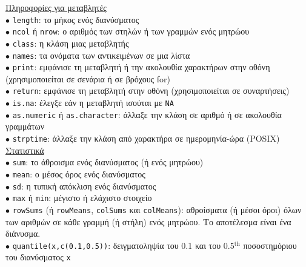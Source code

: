\documentclass[a4paper,10pt,twocolumn]{article}
\begin{document}
\noindent \underline{Πληροφορίες για μεταβλητές}\\
$\bullet$ \texttt{length}: το μήκος ενός διανύσματος\\
$\bullet$ \texttt{ncol} ή \texttt{nrow}: ο αριθμός των στηλών ή των γραμμών ενός μητρώου\\
$\bullet$ \texttt{class}: η κλάση μιας μεταβλητής \\
$\bullet$ \texttt{names}: τα ονόματα των αντικειμένων σε μια λίστα \\
$\bullet$ \texttt{print}: εμφάνισε τη μεταβλητή ή την ακολουθία χαρακτήρων στην οθόνη (χρησιμοποιείται σε
σενάρια ή σε βρόχους for) \\
$\bullet$ \texttt{return}: εμφάνισε τη μεταβλητή στην οθόνη (χρησιμοποιείται σε συναρτήσεις) \\
$\bullet$ \texttt{is.na}: έλεγξε εάν η μεταβλητή ισούται με \texttt{NA}\\
$\bullet$ \texttt{as.numeric} ή \texttt{as.character}: άλλαξε την κλάση σε αριθμό ή σε ακολουθία γραμμάτων\\
$\bullet$ \texttt{strptime}: άλλαξε την κλάση από χαρακτήρα σε ημερομηνία-ώρα (POSIX)\\

\noindent \underline{Στατιστικά}\\
$\bullet$ \texttt{sum}: το άθροισμα ενός διανύσματος (ή ενός μητρώου)\\
$\bullet$ \texttt{mean}: ο μέσος όρος ενός διανύσματος\\
$\bullet$ \texttt{sd}: η τυπική απόκλιση ενός διανύσματος\\
$\bullet$ \texttt{max} ή \texttt{min}: μέγιστο ή ελάχιστο στοιχείο\\
$\bullet$ \texttt{rowSums} (ή \texttt{rowMeans}, \texttt{colSums} και \texttt{colMeans}): 
αθροίσματα (ή μέσοι όροι) όλων των αριθμών σε κάθε γραμμή (ή στήλη) ενός μητρώου. Το αποτέλεσμα είναι ένα
διάνυσμα.\\
$\bullet$ \texttt{quantile(x,c(0.1,0.5))}: δειγματοληψία του 0.1 και του 0.5$\mathrm{^{th}}$ ποσοστημόριου του
διανύσματος \texttt{x}\\
\end{document}
